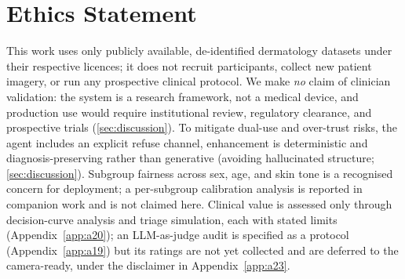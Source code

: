 \documentclass{article}
\begin{document}














\section*{Ethics Statement}\label{sec:ethics}
This work uses only publicly available, de-identified dermatology datasets under their respective
licences; it does not recruit participants, collect new patient imagery, or run any prospective
clinical protocol. We make \emph{no} claim of clinician validation: the system is a research
framework, not a medical device, and production use would require institutional review, regulatory
clearance, and prospective trials (\cref{sec:discussion}). To mitigate dual-use and over-trust risks,
the agent includes an explicit refuse channel, enhancement is deterministic and diagnosis-preserving
rather than generative (avoiding hallucinated structure; \cref{sec:discussion}). Subgroup fairness
across sex, age, and skin tone is a recognised concern for deployment; a per-subgroup calibration
analysis is reported in companion work and is not claimed here. Clinical value is assessed only
through decision-curve analysis and triage simulation, each with
stated limits (Appendix~\ref{app:a20}); an LLM-as-judge audit is specified as a protocol
(Appendix~\ref{app:a19}) but its ratings are not yet collected and are deferred to the
camera-ready, under the disclaimer in Appendix~\ref{app:a23}.
\end{document}
